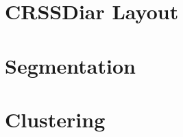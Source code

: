 \section{CRSSDiar Layout}
\label{sec:crssdiar_layout}


\section{Segmentation}
\label{sec:segmentation}

\section{Clustering}
\label{sec:clustering}